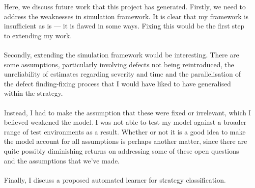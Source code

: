 Here, we discuss future work that this project has generated.
Firstly, we need to address the weaknesses in simulation framework.
It is clear that my framework is insufficient as is --- it is flawed in some
ways.
Fixing this would be the first step to extending my work.\\
\\
Secondly, extending the simulation framework would be interesting.
There are some assumptions, particularly involving defects not being
reintroduced, the unreliability of estimates regarding severity and time and the
parallelisation of the defect finding-fixing process that I would have liked to
have generalised within the strategy.\\
\\
Instead, I had to make the assumption that these were fixed or irrelevant, which
I believed weakened the model.
I was not able to test my model against a broader range of test environments as
a result.
Whether or not it is a good idea to make the model account for all assumptions
is perhaps another matter, since there are quite possibly diminishing returns on
addressing some of these open questions and the assumptions that we've made.\\
\\
Finally, I discuss a proposed automated learner for strategy classification.

